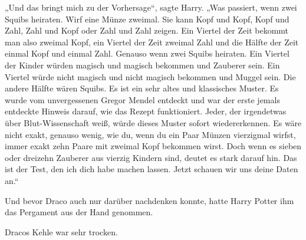 „Und das bringt mich zu der Vorhersage“, sagte Harry. „Was passiert, wenn zwei Squibs heiraten. Wirf eine Münze zweimal. Sie kann Kopf und Kopf, Kopf und Zahl, Zahl und Kopf oder Zahl und Zahl zeigen. Ein Viertel der Zeit bekommt man also zweimal Kopf, ein Viertel der Zeit zweimal Zahl und die Hälfte der Zeit einmal Kopf und einmal Zahl. Genauso wenn zwei Squibs heiraten. Ein Viertel der Kinder würden magisch und magisch bekommen und Zauberer sein. Ein Viertel würde nicht magisch und nicht magisch bekommen und Muggel sein. Die andere Hälfte wären Squibs. Es ist ein sehr altes und klassisches Muster. Es wurde vom unvergessenen Gregor Mendel entdeckt und war der erste jemals entdeckte Hinweis darauf, wie das Rezept funktioniert. Jeder, der irgendetwas über Blut-Wissenschaft weiß, würde dieses Muster sofort wiedererkennen. Es wäre nicht exakt, genauso wenig, wie du, wenn du ein Paar Münzen vierzigmal wirfst, immer exakt zehn Paare mit zweimal Kopf bekommen wirst. Doch wenn es sieben oder dreizehn Zauberer aus vierzig Kindern sind, deutet es stark darauf hin. Das ist der Test, den ich dich habe machen lassen. Jetzt schauen wir uns deine Daten an.“

Und bevor Draco auch nur darüber nachdenken konnte, hatte Harry Potter ihm das Pergament aus der Hand genommen.

Dracos Kehle war sehr trocken.

